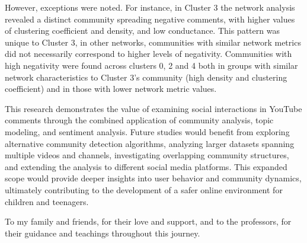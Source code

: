 \documentclass[sigconf]{acmart}
\begin{document}
However, exceptions were noted. For instance, in Cluster 3 the network analysis revealed a distinct 
community spreading negative comments, with higher values of clustering coefficient and density, and low conductance.
This pattern was unique to Cluster 3, in other networks, communities with similar network metrics 
did not necessarily correspond to higher levels of negativity. 
Communities with high negativity were found across clusters 0, 2 and 4 both in groups with similar network 
characteristics to Cluster 3's community (high density and clustering coefficient) and in those with 
lower network metric values. 
    
This research demonstrates the value of examining social interactions in YouTube comments through the 
combined application of community analysis, topic modeling, and sentiment analysis. Future studies would benefit 
from exploring alternative community detection algorithms, analyzing larger datasets spanning 
multiple videos and channels, investigating overlapping community structures, and extending the analysis to 
different social media platforms. This expanded scope would provide deeper insights into 
user behavior and community dynamics, ultimately contributing to the development of a  safer online 
environment for children and teenagers.

\begin{acks}
To my family and friends, for their love and support, and to the professors, for their guidance 
and teachings throughout this journey.
\end{acks}





\end{document}
